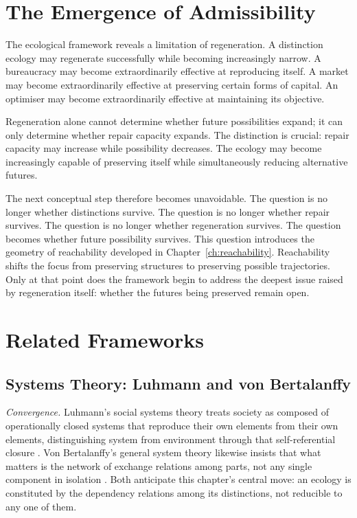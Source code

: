 \documentclass[12pt,twoside,openright]{book}
\begin{document}
\section{The Emergence of Admissibility}
\label{sec:ch12-emergence}

The ecological framework reveals a limitation of
regeneration. A distinction ecology may regenerate
successfully while becoming increasingly narrow. A
bureaucracy may become extraordinarily effective at
reproducing itself. A market may become extraordinarily
effective at preserving certain forms of capital. An
optimiser may become extraordinarily effective at
maintaining its objective.

Regeneration alone cannot determine whether future
possibilities expand; it can only determine whether repair
capacity expands. The distinction is crucial: repair
capacity may increase while possibility decreases. The
ecology may become increasingly capable of preserving
itself while simultaneously reducing alternative futures.

The next conceptual step therefore becomes unavoidable. The
question is no longer whether distinctions survive. The
question is no longer whether repair survives. The question
is no longer whether regeneration survives. The question
becomes whether future possibility survives. This question
introduces the geometry of reachability developed in
Chapter~\ref{ch:reachability}. Reachability shifts the
focus from preserving structures to preserving possible
trajectories. Only at that point does the framework begin
to address the deepest issue raised by regeneration itself:
whether the futures being preserved remain open.

\section{Related Frameworks}
\label{sec:ch12-related-frameworks}

\subsection*{Systems Theory: Luhmann and von Bertalanffy}

\emph{Convergence.} Luhmann's social systems theory treats
society as composed of operationally closed systems that
reproduce their own elements from their own elements,
distinguishing system from environment through that
self-referential closure \parencite{luhmann1984,luhmann1990}.
Von Bertalanffy's general system theory likewise insists that
what matters is the network of exchange relations among parts,
not any single component in isolation \parencite{bertalanffy1968}.
Both anticipate this chapter's central move: an ecology is
constituted by the dependency relations among its distinctions,
not reducible to any one of them.
\end{document}
